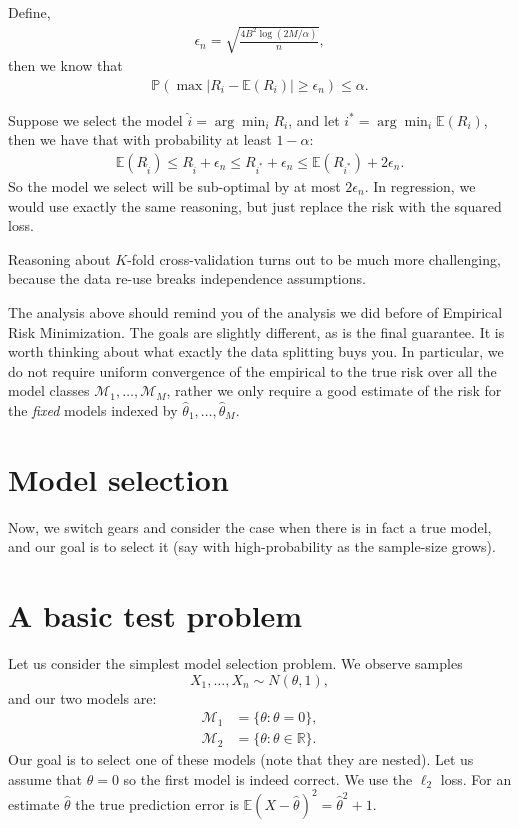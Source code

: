 \documentclass[twoside,12pt]{article}
\begin{document}
Define, 
\begin{align*}
\epsilon_n = \sqrt{ \frac{ 4B^2 \log (2M/\alpha)}{n}},
\end{align*}
then we know that 
\begin{align*}
\mathbb{P}(\max | R_i - \mathbb{E} (R_i) | \geq \epsilon_n) \leq \alpha.
\end{align*}

Suppose we select the model $\widehat{i} = \arg \min_i R_i$, 
and let $i^* = \arg \min_i \mathbb{E}(R_i)$, then we have that with probability
at least $1 - \alpha$:
\begin{align*}
\mathbb{E}(R_{\widehat{i}}) \leq R_{\widehat{i}} + \epsilon_n \leq R_{i^*} + \epsilon_n \leq
\mathbb{E}(R_{i^*}) + 2 \epsilon_n.
\end{align*}
So the model we select will be sub-optimal by at most $2\epsilon_n$. In regression, we would use exactly the same reasoning, but just replace the risk with the squared loss. 

Reasoning about $K$-fold  cross-validation turns out to be much more challenging, because  the data re-use breaks independence assumptions. 

The analysis above should remind you of the analysis we did before of Empirical Risk Minimization. The goals are slightly different, as is the final guarantee. It is worth thinking about what exactly the data splitting buys you. In particular, we do not require uniform convergence of the empirical to the true risk over all the model classes $\mathcal{M}_1,\ldots,\mathcal{M}_M$, rather we only require a good estimate of the risk for the \emph{fixed} models indexed by $\widehat{\theta}_1,\ldots,\widehat{\theta}_M$.


\section{Model selection}
Now, we switch gears and consider the case when there is in fact a true model, and our goal is to select it (say with high-probability as the sample-size grows).
\section{A basic test problem}
Let us consider the simplest model selection problem. We observe samples $$X_1,\ldots,X_n \sim N(\theta,1),$$ and our two models are:
\begin{align*}
\mathcal{M}_1 &= \{\theta: \theta = 0\}, \\
\mathcal{M}_2 &= \{\theta: \theta \in \mathbb{R}\}.
\end{align*}
Our goal is to select one of these models (note that they are nested). Let us assume that $\theta = 0$ so the first model is indeed correct. We use the $\ell_2$ loss. For an estimate $\widehat{\theta}$ the true prediction error is $\mathbb{E}(X - \widehat{\theta})^2 = \widehat{\theta}^2 + 1.$
\end{document}
